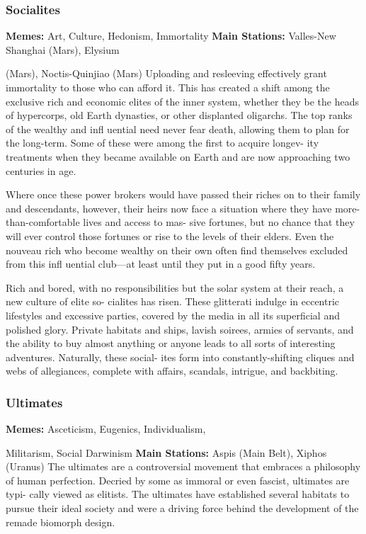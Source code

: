 \subsubsection{Socialites}

\textbf{Memes:} Art, Culture, Hedonism, Immortality
\textbf{Main Stations:} Valles-New Shanghai (Mars), Elysium 

(Mars), Noctis-Quinjiao (Mars)
Uploading and resleeving effectively grant immortality 
to those who can afford it. This has created a shift 
among the exclusive rich and economic elites of the 
inner system, whether they be the heads of hypercorps, 
old Earth dynasties, or other displanted oligarchs. The 
top ranks of the wealthy and infl uential need never 
fear death, allowing them to plan for the long-term. 
Some of these were among the first to acquire longev-
ity treatments when they became available on Earth 
and are now approaching two centuries in age.

Where once these power brokers would have 
passed their riches on to their family and descendants, 
however, their heirs now face a situation where they 
have more-than-comfortable lives and access to mas-
sive fortunes, but no chance that they will ever control 
those fortunes or rise to the levels of their elders. Even 
the nouveau rich who become wealthy on their own 
often find themselves excluded from this infl uential 
club—at least until they put in a good fifty years.

Rich and bored, with no responsibilities but the 
solar system at their reach, a new culture of elite so-
cialites has risen. These glitterati indulge in eccentric 
lifestyles and excessive parties, covered by the media 
in all its superficial and polished glory. Private habitats 
and ships, lavish soirees, armies of servants, and the 
ability to buy almost anything or anyone leads to all 
sorts of interesting adventures. Naturally, these social-
ites form into constantly-shifting cliques and webs of 
allegiances, complete with affairs, scandals, intrigue, 
and backbiting.

\subsubsection{Ultimates}

\textbf{Memes:} Asceticism, Eugenics, Individualism, 

Militarism, Social Darwinism
\textbf{Main Stations:} Aspis (Main Belt), Xiphos (Uranus)
The ultimates are a controversial movement that 
embraces a philosophy of human perfection. Decried 
by some as immoral or even fascist, ultimates are typi-
cally viewed as elitists. The ultimates have established 
several habitats to pursue their ideal society and were 
a driving force behind the development of the remade 
biomorph design.


